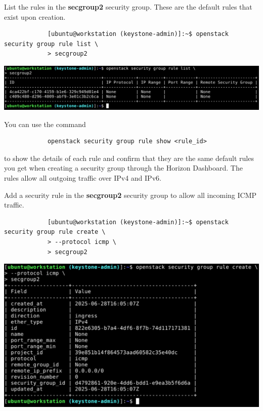 \documentclass[letterpaper, 12pt]{article}
\begin{document}
\begin{enumerate}
    \begin{labstep}
        List the rules in the \textbf{secgroup2} security group.
        These are the default rules that exist upon creation.
        \begin{lstlisting}
            [ubuntu@workstation (keystone-admin)]:~$ openstack security group rule list \
            > secgroup2
        \end{lstlisting}

        \begin{center}
            \includegraphics[width=\linewidth]{images/part1/step18.png}
        \end{center}
    \end{labstep}

    \begin{tipbox}
        You can use the command
        \begin{lstlisting}
            openstack security group rule show <rule_id>
        \end{lstlisting}
        to show the details of each rule and confirm that they are the same default rules you get when creating a security group through the Horizon Dashboard.
        The rules allow all outgoing traffic over IPv4 and IPv6.
    \end{tipbox}

    \begin{labstep}
        Add a security rule in the \textbf{secgroup2} security group to allow all incoming ICMP traffic.
        \begin{lstlisting}
            [ubuntu@workstation (keystone-admin)]:~$ openstack security group rule create \
            > --protocol icmp \
            > secgroup2
        \end{lstlisting}

        \begin{center}
            \includegraphics[width=\linewidth]{images/part1/step19.png}
        \end{center}
    \end{labstep}


\end{enumerate}
\end{document}
